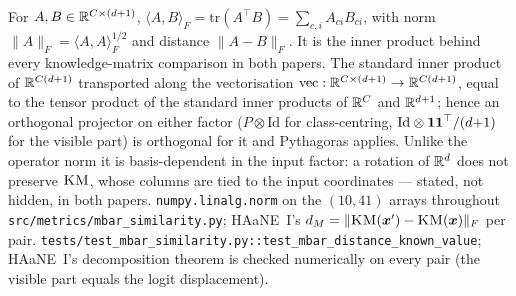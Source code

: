 {For $A,B\in\mathbb{R}^{C\times(d+1)}$, $\langle A,B\rangle_F=\mathrm{tr}(A^\top B)=\sum_{c,i}A_{ci}B_{ci}$, with norm $\|A\|_F=\langle A,A\rangle_F^{1/2}$ and distance $\|A-B\|_F$. It is the inner product behind every knowledge-matrix comparison in both papers.}
{The standard inner product of $\mathbb{R}^{C(d+1)}$ transported along the vectorisation $\mathrm{vec}:\mathbb{R}^{C\times(d+1)}\to\mathbb{R}^{C(d+1)}$, equal to the tensor product of the standard inner products of $\mathbb{R}^C$ and $\mathbb{R}^{d+1}$; hence an orthogonal projector on either factor ($P\otimes\mathrm{Id}$ for class-centring, $\mathrm{Id}\otimes\boldsymbol{1}\boldsymbol{1}^\top/(d{+}1)$ for the visible part) is orthogonal for it and Pythagoras applies. Unlike the operator norm it is basis-dependent in the input factor: a rotation of $\mathbb{R}^d$ does not preserve $\textsc{KM}$, whose columns are tied to the input coordinates --- stated, not hidden, in both papers.}
{\texttt{numpy.linalg.norm} on the $(10,41)$ arrays throughout \texttt{src/metrics/mbar\_similarity.py}; HAaNE~I's $d_M=\|\textsc{KM}(\boldsymbol{x}')-\textsc{KM}(\boldsymbol{x})\|_F$ per pair.}
{\texttt{tests/test\_mbar\_similarity.py::test\_mbar\_distance\_known\_value}; HAaNE~I's decomposition theorem is checked numerically on every pair (the visible part equals the logit displacement).}
